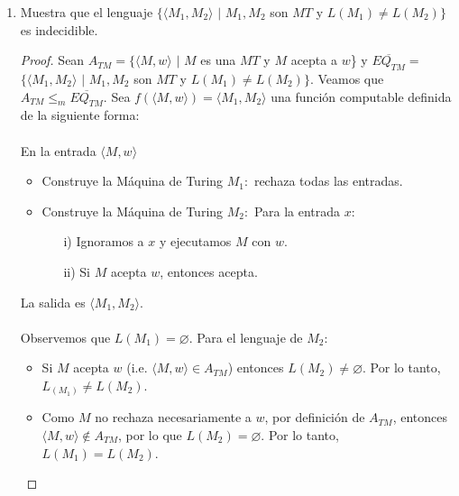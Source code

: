 \documentclass[letterpaper,10pt]{article}
\begin{document}
\begin{enumerate}
       \item Muestra que el lenguaje $\{\langle M_1, M_2 \rangle$ $|$
       $M_1, M_2$ son $MT$ y $L(M_1) \neq L(M_2)\}$ es indecidible.
       \begin{proof}
           Sean $A_{TM} = \{\langle M, w \rangle$ $|$ $M$ es una
           $MT$ y $M$ acepta a $w$\} y $\overline{EQ_{TM}} = $ 
           $\{\langle M_1, M_2 \rangle$ $|$ $M_1, M_2$ son $MT$
           y $L(M_1) \neq L(M_2)\}$. Veamos que
           $A_{TM} \leq_m \overline{EQ_{TM}}$. Sea 
           $f(\langle M, w\rangle) = \langle M_1, M_2\rangle$  una función 
           computable definida de la siguiente forma: \\ \\
           En la entrada $\langle M, w \rangle$
           \begin{itemize}
               \item Construye la Máquina de Turing $M_1:$ rechaza todas las
              entradas.
               \item Construye la Máquina de Turing $M_2:$ Para la entrada $x$:
               \begin{itemize}
                   \item[i)] Ignoramos a $x$ y ejecutamos $M$ con $w$.
                   \item[ii)] Si $M$ acepta $w$, entonces acepta.
               \end{itemize}
            
           \end{itemize}
           
           La salida es $\langle M_1, M_2 \rangle$. \\ \\
           Observemos que $L(M_1) = \varnothing$. Para el lenguaje de 
           $M_2$: 
           \begin{itemize}
               \item Si $M$ acepta $w$ (i.e. 
               $\langle M, w \rangle \in A_{TM}$) entonces
               $L(M_2) \neq \varnothing$. Por lo tanto, 
               $L_(M_1) \neq L(M_2)$.
               \item Como $M$ no rechaza necesariamente a $w$, por definición 
               de $A_{TM}$, entonces $\langle M, w \rangle \notin A_{TM}$,
               por lo que $L(M_2) = \varnothing$. Por lo tanto, 
               $L(M_1) = L(M_2)$.
           \end{itemize}
           

\end{proof}
\end{enumerate}
\end{document}
